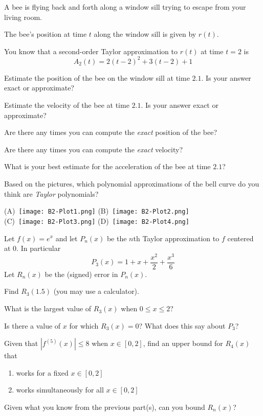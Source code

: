 \documentclass{workbook}
\begin{document}
\begin{slide}
	\question
	A bee is flying back and forth along a window sill trying to escape from your living room.

	The bee's position at time $t$ along the window sill is given by $r(t)$.

	You know that a second-order Taylor approximation to $r(t)$ at time $t=2$
	is
	\[
		A_2(t)=2(t-2)^2 + 3(t-2) + 1
	\]

	\begin{parts}
		\item Estimate the position of the bee on the window sill at time
		$2.1$. Is your answer exact or approximate?
		\item Estimate the velocity of the bee at time $2.1$. Is your answer exact or approximate?
		\item Are there any times you can compute the \emph{exact} position of the bee?
		\item Are there any times you can compute the \emph{exact} velocity?
		\item What is your best estimate for the acceleration of the
		bee at time $2.1$?
	\end{parts}
\end{slide}

\begin{slide}
	\question
	Based on the pictures, which polynomial approximations of the bell curve do you think
	are \emph{Taylor} polynomials?

	(A)~\texttt{[image: B2-Plot1.png]}
	(B)~\texttt{[image: B2-Plot2.png]}\\
	(C)~\texttt{[image: B2-Plot3.png]}
	(D)~\texttt{[image: B2-Plot4.png]}
\end{slide}


\begin{slide}
	\question
	Let $f(x)=e^x$ and let $P_n(x)$ be the $n$th Taylor approximation to $f$ centered at $0$. In particular
	\[
		P_3(x)=1+x+\frac{x^2}{2}+\frac{x^3}{6}
	\]
	Let $R_n(x)$ be the (signed) error in $P_n(x)$.

	\begin{parts}
		\item Find $R_3(1.5)$ (you may use a calculator).
		\item What is the largest value of $R_3(x)$ when $0\leq x\leq 2$?
		\item Is there a value of $x$ for which $R_3(x)=0$? What does this
		say about $P_3$?

		\medskip
		\item Given that $|f^{(5)}(x)| \leq 8$ when $x\in [0,2]$,
		find an upper bound for $R_4(x)$ that
		\begin{enumerate}
			\item works for a fixed $x\in[0,2]$
			\item works simultaneously for all $x\in[0,2]$
		\end{enumerate}
		\item Given what you know from the previous part(s), can you bound $R_n(x)$?
	\end{parts}
\end{slide}
\end{document}
